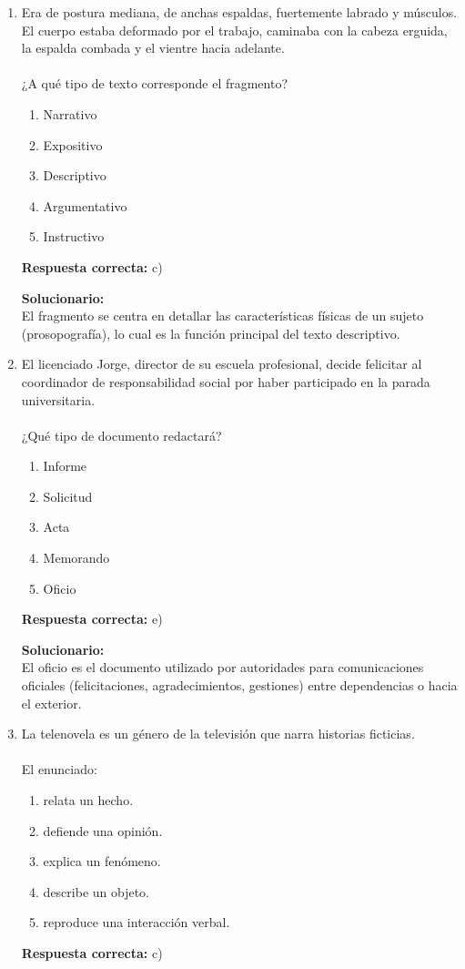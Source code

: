 \begin{enumerate}
	\item Era de postura mediana, de anchas espaldas, fuertemente labrado y músculos. El cuerpo estaba deformado por el trabajo, caminaba con la cabeza erguida, la espalda combada y el vientre hacia adelante.\\
	\\
	¿A qué tipo de texto corresponde el fragmento?
	\begin{enumerate}[label=\alph*)]
		\item Narrativo
		\item Expositivo
		\item Descriptivo
		\item Argumentativo
		\item Instructivo
	\end{enumerate}
	\textbf{Respuesta correcta:} c)
	
	\vspace{2mm}
	\textbf{Solucionario:}\\
	El fragmento se centra en detallar las características físicas de un sujeto (prosopografía), lo cual es la función principal del texto descriptivo.
	
	\vspace{6mm}
	
	\item El licenciado Jorge, director de su escuela profesional, decide felicitar al coordinador de responsabilidad social por haber participado en la parada universitaria.\\
	\\
	¿Qué tipo de documento redactará?
	\begin{enumerate}[label=\alph*)]
		\item Informe
		\item Solicitud
		\item Acta
		\item Memorando
		\item Oficio
	\end{enumerate}
	\textbf{Respuesta correcta:} e)
	
	\vspace{2mm}
	\textbf{Solucionario:}\\
	El oficio es el documento utilizado por autoridades para comunicaciones oficiales (felicitaciones, agradecimientos, gestiones) entre dependencias o hacia el exterior.
	
	\vspace{6mm}
	
	\item La telenovela es un género de la televisión que narra historias ficticias.\\
	\\
	El enunciado:
	\begin{enumerate}[label=\alph*)]
		\item relata un hecho.
		\item defiende una opinión.
		\item explica un fenómeno.
		\item describe un objeto.
		\item reproduce una interacción verbal.
	\end{enumerate}
	\textbf{Respuesta correcta:} c)
	

\end{enumerate}
